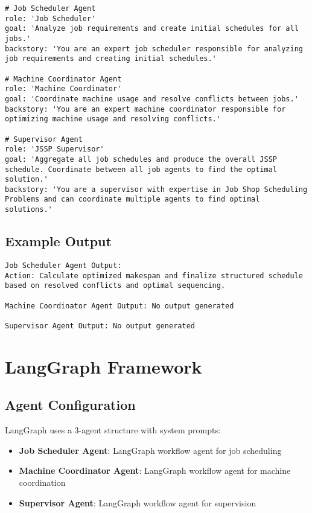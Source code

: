 \documentclass[11pt]{article}
\begin{document}
\begin{lstlisting}[caption=CrewAI Agent Prompts]
# Job Scheduler Agent
role: 'Job Scheduler'
goal: 'Analyze job requirements and create initial schedules for all jobs.'
backstory: 'You are an expert job scheduler responsible for analyzing job requirements and creating initial schedules.'

# Machine Coordinator Agent
role: 'Machine Coordinator'  
goal: 'Coordinate machine usage and resolve conflicts between jobs.'
backstory: 'You are an expert machine coordinator responsible for optimizing machine usage and resolving conflicts.'

# Supervisor Agent
role: 'JSSP Supervisor'
goal: 'Aggregate all job schedules and produce the overall JSSP schedule. Coordinate between all job agents to find the optimal solution.'
backstory: 'You are a supervisor with expertise in Job Shop Scheduling Problems and can coordinate multiple agents to find optimal solutions.'
\end{lstlisting}

\subsection{Example Output}

\begin{lstlisting}[caption=CrewAI Output Example]
Job Scheduler Agent Output:
Action: Calculate optimized makespan and finalize structured schedule based on resolved conflicts and optimal sequencing.

Machine Coordinator Agent Output: No output generated

Supervisor Agent Output: No output generated
\end{lstlisting}

\section{LangGraph Framework}

\subsection{Agent Configuration}

LangGraph uses a 3-agent structure with system prompts:

\begin{itemize}
    \item \textbf{Job Scheduler Agent}: LangGraph workflow agent for job scheduling
    \item \textbf{Machine Coordinator Agent}: LangGraph workflow agent for machine coordination
    \item \textbf{Supervisor Agent}: LangGraph workflow agent for supervision
\end{itemize}
\end{document}
